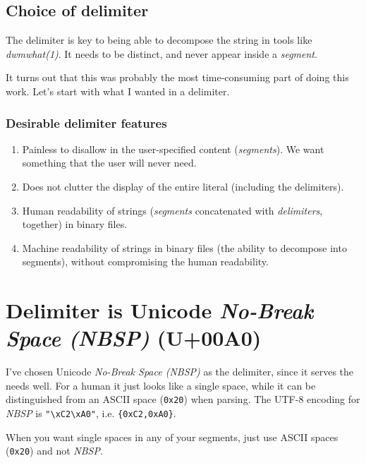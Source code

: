 \documentclass[letterpaper,openany]{book}
\begin{document}
\subsection{Choice of delimiter}
The delimiter is key to being able to decompose the string in tools
like {\em dwmwhat(1)}.  It needs to be distinct, and never appear inside
a {\em segment}.

It turns out that this was probably the most time-consuming part of
doing this work.  Let's start with what I wanted in a delimiter.

\subsubsection{Desirable delimiter features}
\begin{enumerate}
\item Painless to disallow in the user-specified content ({\em segments}).
We want something that the user will never need.
\item Does not clutter the display of the entire literal
(including the delimiters).
\item Human readability of strings ({\em segments} concatenated with
{\em delimiters}, together) in binary files.
\item Machine readability of strings in binary files (the
ability to decompose into segments), without compromising the
human readability.
\end{enumerate}

\section{Delimiter is Unicode {\em No-Break Space (NBSP)} (U+00A0)}
I’ve chosen Unicode {\em No-Break Space (NBSP)} as the delimiter,
since it serves the needs well. For a human it just looks like a
single space, while it can be distinguished from an ASCII space
(\texttt{0x20}) when parsing.  The UTF-8 encoding for {\em NBSP} is
\texttt{"\textbackslash{xC2}\textbackslash{xA0}"}, i.e.
\texttt{\{0xC2,0xA0\}}.

When you want single spaces in any of your segments, just use ASCII
spaces (\texttt{0x20}) and not {\em NBSP}.











\end{document}
